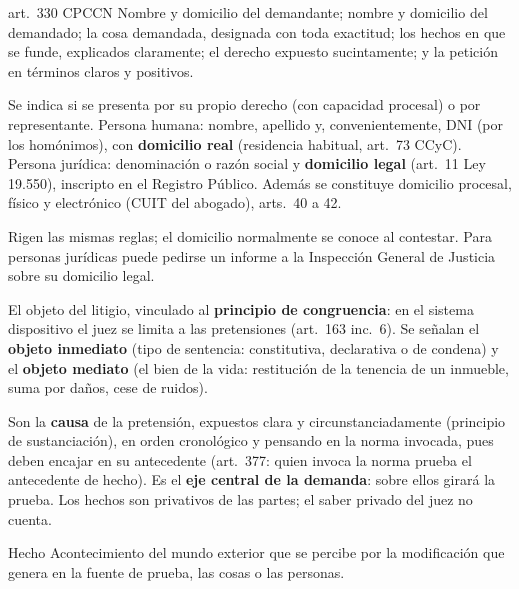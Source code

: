 \documentclass[12pt,oneside]{book}
\begin{document}
\begin{regla}{art.~330 CPCCN}
Nombre y domicilio del demandante; nombre y domicilio del demandado; la cosa demandada, designada con toda exactitud; los hechos en que se funde, explicados claramente; el derecho expuesto sucintamente; y la petición en términos claros y positivos.
\end{regla}

\begin{description}[leftmargin=0pt,style=nextline]
\item[Demandante (inc.~1).] Se indica si se presenta por su propio derecho (con capacidad procesal) o por representante. Persona humana: nombre, apellido y, convenientemente, DNI (por los homónimos), con \textbf{domicilio real} (residencia habitual, art.~73 CCyC). Persona jurídica: denominación o razón social y \textbf{domicilio legal} (art.~11 Ley 19.550), inscripto en el Registro Público. Además se constituye domicilio procesal, físico y electrónico (CUIT del abogado), arts.~40 a 42.
\item[Demandado (inc.~2).] Rigen las mismas reglas; el domicilio normalmente se conoce al contestar. Para personas jurídicas puede pedirse un informe a la Inspección General de Justicia sobre su domicilio legal.
\item[Cosa demandada (inc.~3).] El objeto del litigio, vinculado al \textbf{principio de congruencia}: en el sistema dispositivo el juez se limita a las pretensiones (art.~163 inc.~6). Se señalan el \textbf{objeto inmediato} (tipo de sentencia: constitutiva, declarativa o de condena) y el \textbf{objeto mediato} (el bien de la vida: restitución de la tenencia de un inmueble, suma por daños, cese de ruidos).
\item[Hechos (inc.~4).] Son la \textbf{causa} de la pretensión, expuestos clara y circunstanciadamente (principio de sustanciación), en orden cronológico y pensando en la norma invocada, pues deben encajar en su antecedente (art.~377: quien invoca la norma prueba el antecedente de hecho). Es el \textbf{eje central de la demanda}: sobre ellos girará la prueba. Los hechos son privativos de las partes; el saber privado del juez no cuenta.
\end{description}

\begin{definicion}{Hecho}
Acontecimiento del mundo exterior que se percibe por la modificación que genera en la fuente de prueba, las cosas o las personas.
\end{definicion}
\end{document}
